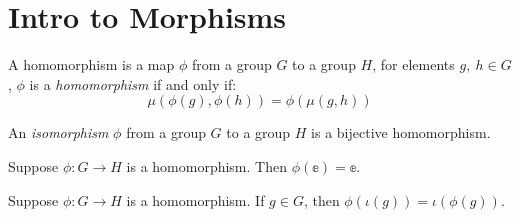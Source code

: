 \section{Intro to Morphisms}

\begin{definition}[Homomorphism]
    \label{definition : Homomorphism}
    \leanok
    A homomorphism is a map \( \phi \) from a group \( G \) to a group \( H \), for
    elements \( g,~ h \in G \), \( \phi \) is a
    \emph{homomorphism} if and only if:
    \[
        \mu(\phi(g),\phi(h)) = \phi(\mu(g,h))
    \]
\end{definition}

\begin{definition}[Isomorphism]
    \label{definition : Isomorphism}
    \leanok
    An \emph{isomorphism} \( \phi \) from a group \( G \) to a group \( H \) is a bijective homomorphism.
\end{definition}

\begin{theorem}
    \label{theorem : hom_id_to_id}
    \leanok
    Suppose \( \phi : G \rightarrow H \) is a homomorphism. Then \(
    \phi(\mathbb e) = \mathbb e \).
\end{theorem}

\begin{theorem}
    \label{theorem : hom_inv_to_inv}
    \leanok
    Suppose \( \phi : G \rightarrow H \) is a homomorphism. If \(g \in G \),
    then \( \phi(\iota(g)) = \iota(\phi(g)) \).
\end{theorem}
